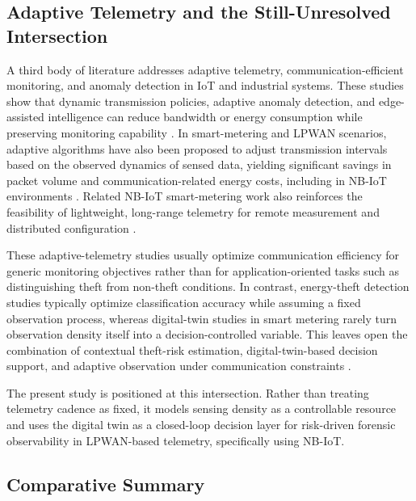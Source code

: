 \documentclass[journal]{IEEEtran}
\begin{document}
\subsection{Adaptive Telemetry and the Still-Unresolved Intersection}
A third body of literature addresses adaptive telemetry, communication-efficient monitoring, and anomaly detection in IoT and industrial systems. These studies show that dynamic transmission policies, adaptive anomaly detection, and edge-assisted intelligence can reduce bandwidth or energy consumption while preserving monitoring capability \cite{b26, b27, b28}. In smart-metering and LPWAN scenarios, adaptive algorithms have also been proposed to adjust transmission intervals based on the observed dynamics of sensed data, yielding significant savings in packet volume and communication-related energy costs, including in NB-IoT environments \cite{b29}. Related NB-IoT smart-metering work also reinforces the feasibility of lightweight, long-range telemetry for remote measurement and distributed configuration \cite{b30, b31}.

These adaptive-telemetry studies usually optimize communication efficiency for generic monitoring objectives rather than for application-oriented tasks such as distinguishing theft from non-theft conditions. In contrast, energy-theft detection studies typically optimize classification accuracy while assuming a fixed observation process, whereas digital-twin studies in smart metering rarely turn observation density itself into a decision-controlled variable. This leaves open the combination of contextual theft-risk estimation, digital-twin-based decision support, and adaptive observation under communication constraints \cite{b6, b14, b22, b29}.

The present study is positioned at this intersection. Rather than treating telemetry cadence as fixed, it models sensing density as a controllable resource and uses the digital twin as a closed-loop decision layer for risk-driven forensic observability in LPWAN-based telemetry, specifically using NB-IoT.

\subsection{Comparative Summary}
\end{document}
